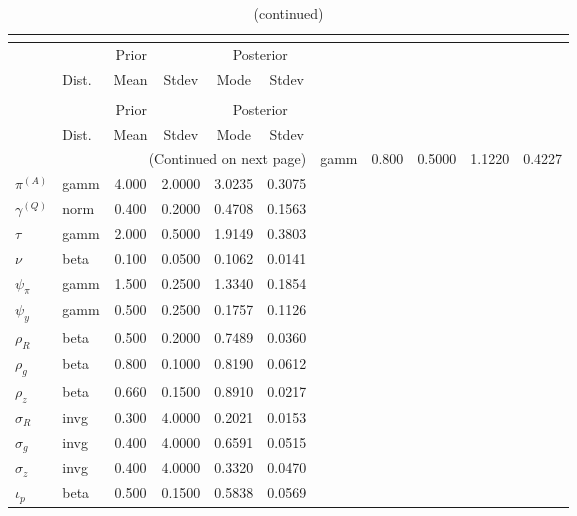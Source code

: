  
\begin{center}
\begin{longtable}{llcccc} 
\caption{Results from posterior maximization (parameters)}\\
 \label{Table:Posterior:1}\\
\toprule 
  & \multicolumn{3}{c}{Prior}  &  \multicolumn{2}{c}{Posterior} \\
  \cmidrule(r{.75em}){2-4} \cmidrule(r{.75em}){5-6}
  & Dist. & Mean  & Stdev & Mode & Stdev \\ 
\midrule \endfirsthead 
\caption{(continued)}\\
 \bottomrule 
  & \multicolumn{3}{c}{Prior}  &  \multicolumn{2}{c}{Posterior} \\
  \cmidrule(r{.75em}){2-4} \cmidrule(r{.75em}){5-6}
  & Dist. & Mean  & Stdev & Mode & Stdev \\ 
\midrule \endhead 
\bottomrule \multicolumn{6}{r}{(Continued on next page)}\endfoot 
\bottomrule\endlastfoot 
${r_{A}}$ & gamm &   0.800 & 0.5000 &   1.1220 &  0.4227 \\ 
${\pi^{(A)}}$ & gamm &   4.000 & 2.0000 &   3.0235 &  0.3075 \\ 
${\gamma^{(Q)}}$ & norm &   0.400 & 0.2000 &   0.4708 &  0.1563 \\ 
${\tau}$ & gamm &   2.000 & 0.5000 &   1.9149 &  0.3803 \\ 
${\nu}$ & beta &   0.100 & 0.0500 &   0.1062 &  0.0141 \\ 
${\psi_\pi}$ & gamm &   1.500 & 0.2500 &   1.3340 &  0.1854 \\ 
${\psi_y}$ & gamm &   0.500 & 0.2500 &   0.1757 &  0.1126 \\ 
${\rho_R}$ & beta &   0.500 & 0.2000 &   0.7489 &  0.0360 \\ 
${\rho_{g}}$ & beta &   0.800 & 0.1000 &   0.8190 &  0.0612 \\ 
${\rho_z}$ & beta &   0.660 & 0.1500 &   0.8910 &  0.0217 \\ 
${\sigma_R}$ & invg &   0.300 & 4.0000 &   0.2021 &  0.0153 \\ 
${\sigma_{g}}$ & invg &   0.400 & 4.0000 &   0.6591 &  0.0515 \\ 
${\sigma_z}$ & invg &   0.400 & 4.0000 &   0.3320 &  0.0470 \\ 
${\iota_p}$ & beta &   0.500 & 0.1500 &   0.5838 &  0.0569 \\ 
\end{longtable}
 \end{center}
